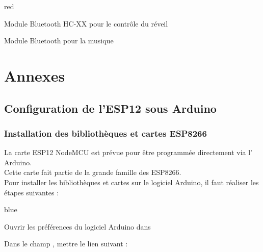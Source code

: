 {\begin{items}{red}{\faviconBookmark}
\item Module Bluetooth HC-XX pour le contrôle du réveil
\item Module Bluetooth pour la musique
\end{items}
\part{Annexes}
\chapter{Configuration de l'ESP12 sous Arduino}


\section{Installation des bibliothèques et cartes ESP8266}

La carte ESP12 NodeMCU est prévue pour être programmée directement via l' Arduino.\\
Cette carte fait partie de la grande famille des ESP8266.\\

Pour installer les bibliothèques et cartes sur le logiciel Arduino, il faut réaliser les étapes suivantes : 


\begin{items}{blue}{\Triangle}

    \item Ouvrir les préférences du logiciel Arduino dans 

    \item Dans le champ , mettre le lien suivant : \\

    
    

\end{items}}

